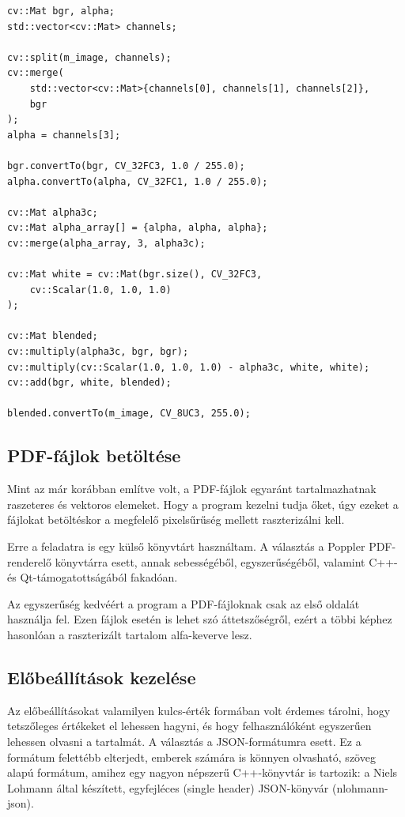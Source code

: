 \begin{listing}[!h]
    \caption{Az alfa-keverés implementációja egy teljesen fehér háttér esetén.}
    \label{lst:alpha-blend}
    \begin{verbatim}
cv::Mat bgr, alpha;
std::vector<cv::Mat> channels;

cv::split(m_image, channels);
cv::merge(
    std::vector<cv::Mat>{channels[0], channels[1], channels[2]}, 
    bgr
);
alpha = channels[3];

bgr.convertTo(bgr, CV_32FC3, 1.0 / 255.0);
alpha.convertTo(alpha, CV_32FC1, 1.0 / 255.0);

cv::Mat alpha3c;
cv::Mat alpha_array[] = {alpha, alpha, alpha};
cv::merge(alpha_array, 3, alpha3c);

cv::Mat white = cv::Mat(bgr.size(), CV_32FC3, 
    cv::Scalar(1.0, 1.0, 1.0)
);

cv::Mat blended;
cv::multiply(alpha3c, bgr, bgr);
cv::multiply(cv::Scalar(1.0, 1.0, 1.0) - alpha3c, white, white);
cv::add(bgr, white, blended);

blended.convertTo(m_image, CV_8UC3, 255.0);
    \end{verbatim}
\end{listing}

\subsection{PDF-fájlok betöltése}

Mint az már korábban említve volt, a PDF-fájlok egyaránt tartalmazhatnak raszeteres és vektoros elemeket. Hogy a program kezelni tudja őket, úgy ezeket a fájlokat betöltéskor a megfelelő pixelsűrűség mellett raszterizálni kell. 

Erre a feladatra is egy külső könyvtárt használtam. A választás a Poppler PDF-renderelő könyvtárra esett, annak sebességéből, egyszerűségéből, valamint C++- és Qt-támogatottságából fakadóan.

Az egyszerűség kedvéért a program a PDF-fájloknak csak az első oldalát használja fel. Ezen fájlok esetén is lehet szó áttetszőségről, ezért a többi képhez hasonlóan a raszterizált tartalom alfa-keverve lesz. 

\subsection{Előbeállítások kezelése}

Az előbeállításokat valamilyen kulcs-érték formában volt érdemes tárolni, hogy tetszőleges értékeket el lehessen hagyni, és hogy felhasználóként egyszerűen lehessen olvasni a tartalmát. A választás a JSON-formátumra esett. Ez a formátum felettébb elterjedt, emberek számára is könnyen olvasható, szöveg alapú formátum, amihez egy nagyon népszerű C++-könyvtár is tartozik: a Niels Lohmann által készített, egyfejléces (single header) JSON-könyvár (nlohmann-json). 

